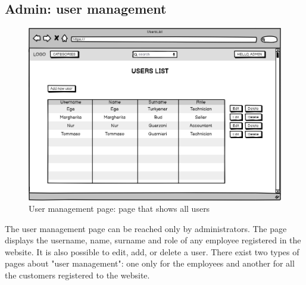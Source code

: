 \subsection{Admin: user management}
    \begin{figure}[H]
        \centering
        \includegraphics[width=\textwidth,height=0.7\textheight,keepaspectratio]{mockups/usersListPageMockup.png}
            \caption{User management page: page that shows all users}
            \label{fig:UserManagement}
    \end{figure}
    The user management page can be reached only by administrators. The page displays the username, name, surname and role of any employee registered in the website. It is also possible to edit, add, or delete a user.
    There exist two types of pages about "user management": one only for the employees and another for all the customers registered to the website.

